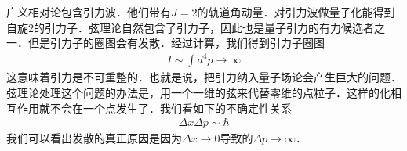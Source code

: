  
 广义相对论包含引力波．他们带有$J = 2$的轨道角动量．对引力波做量子化能得到自旋2的引力子．弦理论自然包含了引力子，因此也是量子引力的有力候选者之一．但是引力子的圈图会有发散．经过计算，我们得到引力子圈图
 \begin{align}
 I \sim \int d^4 p \rightarrow \infty 
 \end{align}
 这意味着引力是不可重整的．也就是说，把引力纳入量子场论会产生巨大的问题．弦理论处理这个问题的办法是，用一个一维的弦来代替零维的点粒子．这样的化相互作用就不会在一个点发生了．我们看如下的不确定性关系
 \begin{align}
\Delta x \Delta p \sim \hbar  
 \end{align}
我们可以看出发散的真正原因是因为$\Delta x \rightarrow 0$导致的$\Delta p \rightarrow  \infty  $．  